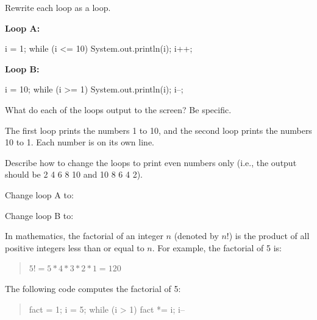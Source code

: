 \newpage


\Q Rewrite each  loop as a  loop.

\begin{multicols}{2}

\textbf{Loop A:}

\begin{answer}[6em]
\begin{javaans}
i = 1;
while (i <= 10) {
    System.out.println(i);
    i++;
}
\end{javaans}
\end{answer}

\columnbreak

\textbf{Loop B:}

\begin{answer}[6em]
\begin{javaans}
i = 10;
while (i >= 1) {
    System.out.println(i);
    i--;
}
\end{javaans}
\end{answer}

\end{multicols}


\Q What do each of the  loops output to the screen? Be specific.

\begin{answer}
The first loop prints the numbers 1 to 10, and the second loop prints the numbers 10 to 1.
Each number is on its own line.
\end{answer}


\Q Describe how to change the  loops to print even numbers only (i.e., the output should be 2 4 6 8 10 and 10 8 6 4 2).

\begin{answer}
Change loop A to:~ 

\medskip
Change loop B to:~ 
\end{answer}




\Q In mathematics, the factorial of an integer $n$ (denoted by $n!$) is the product of all positive integers less than or equal to $n$.
For example, the factorial of 5 is:

\begin{quote}
$5! = 5 * 4 * 3 * 2 * 1 = 120$
\end{quote}

The following code computes the factorial of 5:

\begin{quote}
\begin{javalst}
fact = 1;
i = 5;
while (i > 1) {
    fact *= i;
    i--
}
\end{javalst}
\end{quote}

